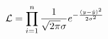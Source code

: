 \documentclass[preview]{standalone}
\begin{document}
\begin{align*}
\special{dvisvgm:raw <g id='unique000'>}\mathcal{L}=\prod^n_{i=1}\frac{1}{\sqrt{2\pi}\sigma}e^{-\frac{(y-\hat{y})^2}{2\sigma^2}}\special{dvisvgm:raw </g>}
\end{align*}
\end{document}
